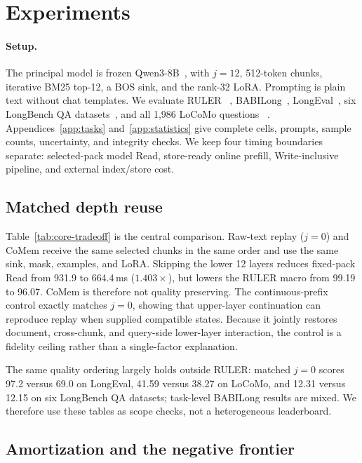 \section{Experiments}
\label{sec:experiments}

\paragraph{Setup.}
The principal model is frozen Qwen3-8B~\citep{qwen3}, with $j{=}12$,
512-token chunks, iterative BM25 top-12, a BOS sink, and the rank-32 LoRA.
Prompting is plain text without chat templates. We evaluate RULER
~\citep{ruler}, BABILong~\citep{babilong}, LongEval~\citep{longchat}, six
LongBench QA datasets~\citep{longbench}, and all 1,986 LoCoMo questions
~\citep{locomo}. Appendices~\ref{app:tasks} and~\ref{app:statistics} give
complete cells, prompts, sample counts, uncertainty, and integrity checks. We keep four
timing boundaries separate: selected-pack model Read, store-ready online
prefill, Write-inclusive pipeline, and external index/store cost.

\subsection{Matched depth reuse}


Table~\ref{tab:core-tradeoff} is the central comparison. Raw-text replay
($j{=}0$) and CoMem receive the same selected chunks in the same order and use
the same sink, mask, examples, and LoRA. Skipping the lower 12 layers reduces
fixed-pack Read from 931.9 to 664.4\,ms ($1.403\times$), but lowers the RULER
macro from 99.19 to 96.07. CoMem is therefore not quality preserving. The
continuous-prefix control exactly matches $j{=}0$, showing that upper-layer
continuation can reproduce replay when supplied compatible states. Because it
jointly restores document, cross-chunk, and query-side lower-layer interaction,
the control is a fidelity ceiling rather than a single-factor explanation.

The same quality ordering largely holds outside RULER: matched $j{=}0$ scores
97.2 versus 69.0 on LongEval, 41.59 versus 38.27 on LoCoMo, and 12.31 versus
12.15 on six LongBench QA datasets; task-level BABILong results are mixed. We
therefore use these tables as scope checks, not a heterogeneous leaderboard.

\subsection{Amortization and the negative frontier}


